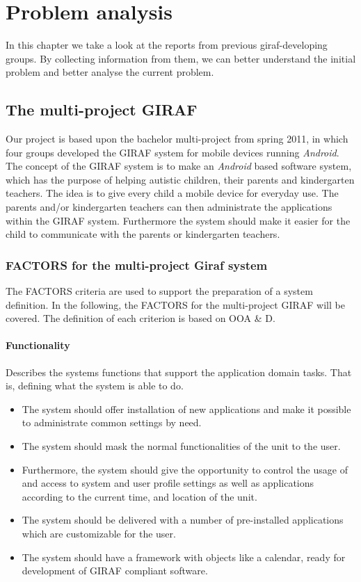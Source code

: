 \chapter{Problem analysis}

In this chapter we take a look at the reports from previous giraf-developing groups. By collecting information from them, we can better understand the initial problem and better analyse the current problem.

\section{The multi-project GIRAF}
Our project is based upon the bachelor multi-project from spring 2011, in which four groups developed the GIRAF system for mobile devices running \textit{Android}. The concept of the GIRAF system is to make an \textit{Android} based software system, which has the purpose of helping autistic children, their parents and kindergarten teachers. The idea is to give every child a mobile device for everyday use. The parents and/or kindergarten teachers can then administrate the applications within the GIRAF system. Furthermore the system should make it easier for the child to communicate with the parents or kindergarten teachers. 

\subsection{FACTORS for the multi-project Giraf system}
The FACTORS criteria are used to support the preparation of a system definition. In the following, the FACTORS for the multi-project GIRAF will be covered. The definition of each criterion is based on OOA \& D.\cite{giraffactors}

\subsubsection{Functionality} 
Describes the systems functions that support the application domain tasks. That is, defining
what the system is able to do.
\begin{itemize}
	\item The system should offer installation of new applications and make it possible to administrate common settings by need. 
	\item The system should mask the normal functionalities of the unit to the user.
	\item Furthermore, the system should give the opportunity to control the usage of and access to system and user profile settings as well as applications according to the current time, and location of the unit.
	\item The system should be delivered with a number of pre-installed applications which are customizable for the user.
	\item The system should have a framework with objects like a calendar, ready for development of GIRAF compliant software.
\end{itemize}

